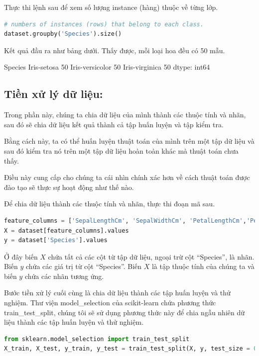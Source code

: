 Thực thi lệnh sau để xem số lượng instance (hàng) thuộc về từng lớp.

\begin{lstlisting}[language=Python]
# numbers of instances (rows) that belong to each class.
dataset.groupby('Species').size()
\end{lstlisting}

Kết quả đầu ra như bảng dưới. Thấy được, mỗi loại hoa đều có 50 mẫu.

\begin{terminal}
Species
Iris-setosa        50
Iris-versicolor    50
Iris-virginica     50
dtype: int64
\end{terminal}

\subsection{Tiền xử lý dữ liệu:}

Trong phần này, chúng ta chia dữ liệu của mình thành các thuộc tính và nhãn,
sau đó sẽ chia dữ liệu kết quả thành cả tập huấn luyện và tập kiểm tra.

Bằng cách này, ta có thể huấn luyện thuật toán của mình trên
một tập dữ liệu và sau đó kiểm tra nó trên một tập dữ liệu hoàn toàn khác
mà thuật toán chưa thấy.

Điều này cung cấp cho chúng ta cái nhìn chính xác hơn về cách thuật toán
được đào tạo sẽ thực sự hoạt động như thế nào.

Để chia dữ liệu thành các thuộc tính và nhãn, thực thi đoạn mã sau.

\begin{lstlisting}[language=Python]
feature_columns = ['SepalLengthCm', 'SepalWidthCm', 'PetalLengthCm','PetalWidthCm']
X = dataset[feature_columns].values
y = dataset['Species'].values
\end{lstlisting}

Ở đây biến $X$ chứa tất cả các cột từ tập dữ liệu, ngoại trừ cột \enquote{Species},
là nhãn. Biến $y$ chứa các giá trị từ cột \enquote{Species}. Biến $X$ là tập thuộc tính
của chúng ta và biến $y$ chứa các nhãn tương ứng.

Bước tiền xử lý cuối cùng là chia dữ liệu thành các tập huấn luyện và thử nghiệm.
Thư viện model\_selection của scikit-learn chứa phương thức train\_test\_split,
chúng tôi sẽ sử dụng phương thức này để chia ngẫu nhiên dữ liệu thành
các tập huấn luyện và thử nghiệm.

\begin{lstlisting}[language=Python]
from sklearn.model_selection import train_test_split
X_train, X_test, y_train, y_test = train_test_split(X, y, test_size = 0.3, random_state = 0)
\end{lstlisting}

